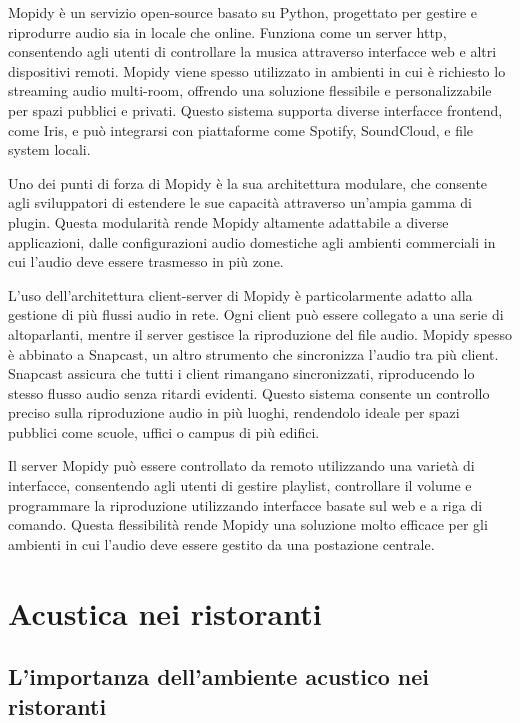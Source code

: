Mopidy è un servizio open-source  basato su Python, progettato per gestire e riprodurre audio sia in locale che online. Funziona come un server \gls{http}, consentendo agli utenti di controllare la musica attraverso interfacce web e altri dispositivi remoti. Mopidy viene spesso utilizzato in ambienti in cui è richiesto lo streaming audio multi-room, offrendo una soluzione flessibile e personalizzabile per spazi pubblici e privati. Questo sistema supporta diverse interfacce frontend, come Iris, e può integrarsi con piattaforme come Spotify, SoundCloud, e file system locali.

Uno dei punti di forza di Mopidy è la sua architettura modulare, che consente agli sviluppatori di estendere le sue capacità attraverso un'ampia gamma di plugin. Questa modularità rende Mopidy altamente adattabile a diverse applicazioni, dalle configurazioni audio domestiche agli ambienti commerciali in cui l'audio deve essere trasmesso in più zone.

L'uso dell'architettura client-server di Mopidy è particolarmente adatto alla gestione di più flussi audio in rete. Ogni client può essere collegato a una serie di altoparlanti, mentre il server gestisce la riproduzione del file audio. Mopidy spesso è abbinato a Snapcast, un altro strumento che sincronizza l'audio tra più client. Snapcast assicura che tutti i client rimangano sincronizzati, riproducendo lo stesso flusso audio senza ritardi evidenti. Questo sistema consente un controllo preciso sulla riproduzione audio in più luoghi, rendendolo ideale per spazi pubblici come scuole, uffici o campus di più edifici.

Il server Mopidy può essere controllato da remoto utilizzando una varietà di interfacce, consentendo agli utenti di gestire playlist, controllare il volume e programmare la riproduzione utilizzando interfacce basate sul web e a riga di comando. Questa flessibilità rende Mopidy una soluzione molto efficace per gli ambienti in cui l'audio deve essere gestito da una postazione centrale.~\cite{cit-mopidy}

\section{Acustica nei ristoranti}

\subsection{L'importanza dell'ambiente acustico nei ristoranti}
\noindent

